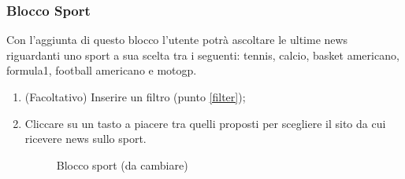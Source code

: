 \subsubsection{Blocco Sport}
Con l'aggiunta di questo blocco l'utente potrà ascoltare le ultime news riguardanti uno sport a sua scelta tra i seguenti: tennis, calcio, basket americano, formula1, football americano e motogp.
\begin{enumerate}
	\item (Facoltativo) Inserire un filtro (punto \ref{filter});
	\item Cliccare su un tasto a piacere tra quelli proposti per scegliere il sito da cui ricevere news sullo sport.
	\begin{figure}[!ht]
		\centering
		\caption{Blocco sport (da cambiare)}
	\end{figure}
\end{enumerate}
\newpage
